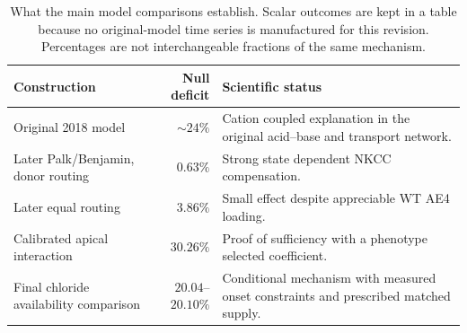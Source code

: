 \begin{table}[t]
\centering
\caption{What the main model comparisons establish. Scalar outcomes are kept in a table because no original-model time series is manufactured for this revision. Percentages are not interchangeable fractions of the same mechanism.}
\label{tab:model-comparison}
\begin{tabularx}{\textwidth}{p{}rX}
\toprule
Construction & Null deficit & Scientific status\\
\midrule
Original 2018 model & $\sim24\%$ & Cation coupled explanation in the original acid--base and transport network.\\
Later Palk/Benjamin, donor routing & $0.63\%$ & Strong state dependent NKCC compensation.\\
Later equal routing & $3.86\%$ & Small effect despite appreciable WT AE4 loading.\\
Calibrated apical interaction & $30.26\%$ & Proof of sufficiency with a phenotype selected coefficient.\\
Final chloride availability comparison & $20.04$--$20.10\%$ & Conditional mechanism with measured onset constraints and prescribed matched supply.\\
\bottomrule
\end{tabularx}
\end{table}
